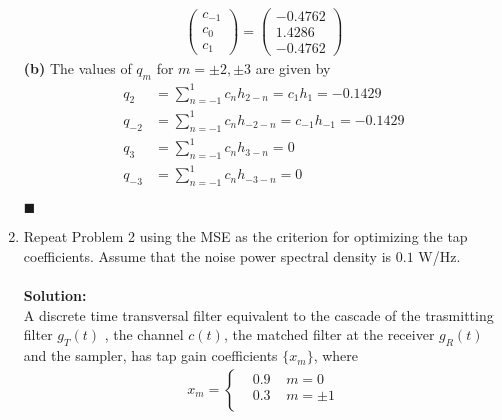 \documentclass[a4paper,12pt]{article}
\begin{document}
\begin{enumerate}
            \begin{align*}
                \left(
                \begin{array}{c}
                    c_{-1} \\ 
                    c_0 \\
                    c_1  
                \end{array}
                \right)
                =\left(
            \begin{array}{c}
                -0.4762 \\ 
                1.4286 \\
                -0.4762 
            \end{array}
            \right)
            \end{align*}
            \textbf{(b)} The values of $q_m$ for $m = \pm 2, \pm 3$ are given by 
            \begin{align*}
                q_2 &= \sum_{n = -1}^{1} c_n h_{2 - n} = c_1h_1 = -0.1429 \\ 
                q_{-2} &=  \sum_{n = -1}^{1} c_n h_{-2 - n} = c_{-1}h_{-1} = -0.1429 \\
                q_3 &= \sum_{n = -1}^{1} c_n h_{3 - n} = 0 \\ 
                q_{-3} &=  \sum_{n = -1}^{1} c_n h_{-3 - n} = 0
            \end{align*}
            \begin{flushright}
                $\blacksquare$
            \end{flushright}
        \item
            Repeat Problem 2 using the MSE as the criterion for optimizing the tap coefficients. Assume that the noise power spectral density is $0.1$ W/Hz. \\ \\ 
            \textbf{Solution:} \\
            A discrete time transversal filter equivalent to the cascade of the trasmitting filter $g_T(t)$ , the channel $c(t)$, the matched filter at the receiver $g_R(t)$ and the sampler, has tap gain coefficients $\{ x_m \}$, where 
            \begin{align*}
                x_m = \left\{ 
                \begin{aligned}
                    & 0.9 \;\;\;\; m = 0 \\ 
                    & 0.3 \;\;\;\; m = \pm 1 \\

\end{aligned}
\end{align*}
\end{enumerate}
\end{document}

